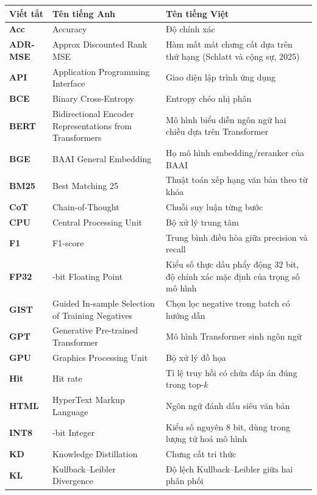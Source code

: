 \documentclass[../DoAn.tex]{subfiles}
\begin{document}
\begingroup
\small
\setlength{\tabcolsep}{4pt}
\begin{longtable}{>{\raggedright\arraybackslash}p{2cm} >{\raggedright\arraybackslash}p{5.2cm} >{\raggedright\arraybackslash}p{6.5cm}}
	\hline
	\textbf{Viết tắt} & \textbf{Tên tiếng Anh} & \textbf{Tên tiếng Việt} \\ \hline
	\endhead
	\textbf{Acc} & Accuracy & Độ chính xác \\
	\textbf{ADR-MSE} & Approx Discounted Rank MSE & Hàm mất mát chưng cất dựa trên thứ hạng (Schlatt và cộng sự, 2025) \\
	\textbf{API} & Application Programming Interface & Giao diện lập trình ứng dụng \\
	\textbf{BCE} & Binary Cross-Entropy & Entropy chéo nhị phân \\
	\textbf{BERT} & Bidirectional Encoder Representations from Transformers & Mô hình biểu diễn ngôn ngữ hai chiều dựa trên Transformer \\
	\textbf{BGE} & BAAI General Embedding & Họ mô hình embedding/reranker của BAAI \\
	\textbf{BM25} & Best Matching 25 & Thuật toán xếp hạng văn bản theo từ khóa \\
	\textbf{CoT} & Chain-of-Thought & Chuỗi suy luận từng bước \\
	\textbf{CPU} & Central Processing Unit & Bộ xử lý trung tâm \\
	\textbf{F1} & F1-score & Trung bình điều hòa giữa precision và recall \\
	\textbf{FP32} & 32-bit Floating Point & Kiểu số thực dấu phẩy động 32 bit, độ chính xác mặc định của trọng số mô hình \\
	\textbf{GIST} & Guided In-sample Selection of Training Negatives & Chọn lọc negative trong batch có hướng dẫn \\
	\textbf{GPT} & Generative Pre-trained Transformer & Mô hình Transformer sinh ngôn ngữ \\
	\textbf{GPU} & Graphics Processing Unit & Bộ xử lý đồ họa \\
	\textbf{Hit} & Hit rate & Tỉ lệ truy hồi có chứa đáp án đúng trong top-$k$ \\
	\textbf{HTML} & HyperText Markup Language & Ngôn ngữ đánh dấu siêu văn bản \\
	\textbf{INT8} & 8-bit Integer & Kiểu số nguyên 8 bit, dùng trong lượng tử hoá mô hình \\
	\textbf{KD} & Knowledge Distillation & Chưng cất tri thức \\
	\textbf{KL} & Kullback--Leibler Divergence & Độ lệch Kullback--Leibler giữa hai phân phối \\

\end{longtable}
\end{document}
